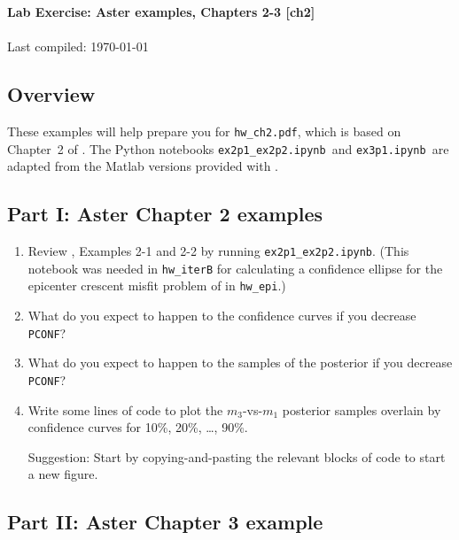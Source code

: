 \documentclass[11pt,titlepage,fleqn]{article}
\newcommand{\tfileA}{{\tt ex2p1\_ex2p2.ipynb}}
\newcommand{\tfileB}{{\tt ex3p1.ipynb}}
\begin{document}

\begin{spacing}{1.2}
\centering
{\large \bf Lab Exercise: Aster examples, Chapters 2-3 [ch2]} \\
\cltag\ \\
Last compiled: \today \\
\end{spacing}

\subsection*{Overview}

These examples will help prepare you for \verb+hw_ch2.pdf+, which is based on Chapter~2 of \citet{Aster}. The Python notebooks \tfileA\ and \tfileB\ are adapted from the Matlab versions provided with \citet{Aster}.

\subsection*{Part I: Aster Chapter 2 examples}

\begin{enumerate}
\item Review \citet{Aster}, Examples 2-1 and 2-2 by running \tfileA.
(This notebook was needed in \verb+hw_iterB+ for calculating a confidence ellipse for the epicenter crescent misfit problem of \citet{Tarantola2005} in \verb+hw_epi+.)

\item What do you expect to happen to the confidence curves if you decrease \verb+PCONF+?

\item What do you expect to happen to the samples of the posterior if you decrease \verb+PCONF+?

\item Write some lines of code to plot the $m_3$-vs-$m_1$ posterior samples overlain by confidence curves for 10\%, 20\%, \ldots, 90\%.

Suggestion: Start by copying-and-pasting the relevant blocks of code to start a new figure.

\end{enumerate}


\subsection*{Part II: Aster Chapter 3 example}
\end{document}
